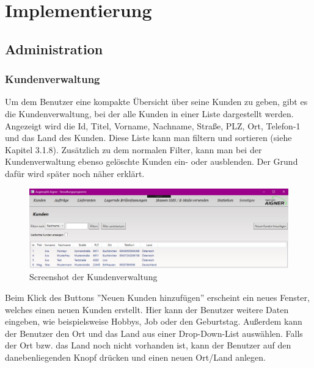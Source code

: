 \chapter{Implementierung}\label{cha:theoretical-background}
\section{Administration}
\subsection{Kundenverwaltung}
Um dem Benutzer eine kompakte Übersicht über seine Kunden zu geben, gibt es die Kundenverwaltung, bei der alle Kunden in einer Liste dargestellt werden. Angezeigt wird die Id, Titel, Vorname, Nachname, Straße, PLZ, Ort, Telefon-1 und das Land des Kunden. Diese Liste kann man filtern und sortieren (siehe Kapitel 3.1.8). Zusätzlich zu dem normalen Filter, kann man bei der Kundenverwaltung ebenso gelöschte Kunden ein- oder ausblenden. Der Grund dafür wird später noch näher erklärt.
\begin{figure}[H]
\begin{center}
	\includegraphics[scale=.45]{images/Kunden.png}
\end{center}
	\caption{Screenshot der Kundenverwaltung}
	\label{fig:sample}
\end{figure}
\noindent Beim Klick des Buttons ''Neuen Kunden hinzufügen'' erscheint ein neues Fenster, welches einen neuen Kunden erstellt. Hier kann der Benutzer weitere Daten eingeben, wie beispielsweise Hobbys, Job oder den Geburtstag. Außerdem kann der Benutzer den Ort und das Land aus einer Drop-Down-List auswählen. Falls der Ort bzw. das Land noch nicht vorhanden ist, kann der Benutzer auf den danebenliegenden Knopf drücken und einen neuen Ort/Land anlegen. 
